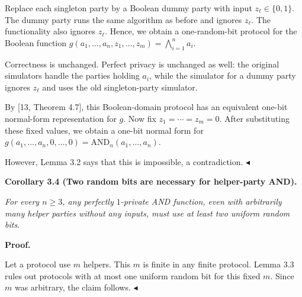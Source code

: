 \documentclass[10pt,a4paper]{article}
\begin{document}
Replace each singleton party by a Boolean dummy party with input
$z_{\ell}\in\{0,1\}$. The dummy party runs the same algorithm as before and
ignores $z_{\ell}$. The functionality also ignores $z_{\ell}$. Hence, we obtain a
one-random-bit protocol for the Boolean function
$g(a_{1},\dots,a_{n},z_{1},\dots,z_{m})=\bigwedge_{i=1}^{n}a_{i}$.\par




Correctness is unchanged. Perfect privacy is unchanged as well: the original
simulators handle the parties holding $a_{i}$, while the simulator for a dummy
party ignores $z_{\ell}$ and uses the old singleton-party simulator.\par




By [13, Theorem 4.7], this Boolean-domain protocol has an equivalent
one-bit normal-form representation for $g$. Now fix $z_{1}=\cdots=z_{m}=0$.
After substituting these fixed values, we
obtain a one-bit normal form for
$g(a_{1},\dots,a_{n},0,\dots,0)=\mathrm{AND}_{n}(a_{1},\dots,a_{n})$.\par




However, Lemma 3.2 says that this is impossible, a contradiction.
$\blacktriangleleft$\par





\par\medskip\noindent\textbf{
\textbf{Corollary 3.4}\textbf{ }(Two random bits are necessary for helper-party AND)\textbf{.}
}\par



\emph{For every $n\geq 3$, any perfectly $1$-private AND function, even with arbitrarily many helper parties without any inputs, must use at least two uniform random bits.}\par







\par\medskip\noindent\textbf{Proof.}\par




Let a protocol use $m$ helpers. This $m$ is finite in any finite protocol. Lemma 3.3 rules out protocols with at most one uniform random bit for this fixed $m$. Since $m$ was arbitrary, the claim follows.
$\blacktriangleleft$\par
\end{document}
